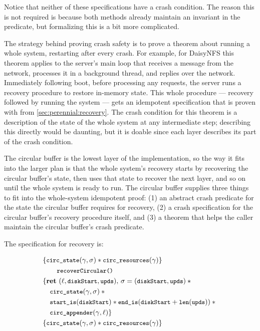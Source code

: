 Notice that neither of these specifications have a crash condition. The reason
this is not required is because both methods already maintain an invariant in
the  predicate, but formalizing this is a bit more
complicated.

The strategy behind proving crash safety is to prove a theorem about running a
whole system, restarting after every crash. For example, for DaisyNFS this
theorem applies to the server's main loop that receives a message from the
network, processes it in a background thread, and replies over the network.
Immediately following boot, before processing any requests, the server runs a
recovery procedure to restore in-memory state. This whole procedure --- recovery
followed by running the system --- gets an idempotent specification that is
proven with  from \autoref{sec:perennial:recovery}. The
crash condition for this theorem is a description of the state of the whole
system at any intermediate step; describing this directly would be daunting, but
it is doable since each layer describes its part of the crash condition.

The circular buffer is the lowest layer of the implementation, so the way it
fits into the larger plan is that the whole system's recovery starts by
recovering the circular buffer's state, then uses that state to recover the next
layer, and so on until the whole system is ready to run. The circular buffer
supplies three things to fit into the whole-system idempotent proof: (1) an
abstract crash predicate for the state the circular buffer requires for
recovery, (2) a crash specification for the circular buffer's recovery procedure
itself, and (3) a theorem that helps the caller maintain the circular buffer's
crash predicate.

The specification for recovery is:

\begin{align*}
  &\{ \circstate(\gamma, \sigma) \sep \cc{circ_resources}(\gamma) \} \\
  &\qquad\cc{recoverCircular()} \\
  &\{ \Ret{(\ell, \cc{diskStart}, \cc{upds})} \sigma = (\cc{diskStart}, \cc{upds}) \sep {} \\
  &\quad \circstate(\gamma, \sigma) \sep {}  \\
  &\quad \startIs(\cc{diskStart}) \sep \diskendIs(\cc{diskStart} + \cc{len}(\cc{upds})) \sep {} \\
  &\quad \cc{circ_appender}(\gamma, \ell) \} \\
  &\{ \circstate(\gamma, \sigma) \sep \cc{circ_resources}(\gamma) \} \\
\end{align*}

